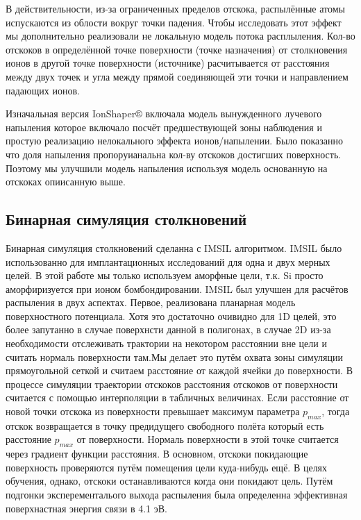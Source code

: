 \documentclass[a4paper,fontsize=12pt]{article}
\begin{document}
В действительности, из-за ограниченных пределов отскока, распылённые атомы испускаются из облости вокруг точки падения. Чтобы исследовать этот эффект мы дополнительно реализовали не локальную модель потока расплыления. Кол-во отскоков в определённой точке поверхности (точке назначения) от столкновения ионов в другой точке поверхности (источнике) расчитывается от расстояния между двух точек и угла между прямой соединяющей эти точки и направлением падающих ионов.

Изначальная версия IonShaper® включала модель вынужденного лучевого напыления которое включало посчёт предшествующей зоны наблюдения и простую реализацию нелокального эффекта ионов/напылении. Было показанно что доля напыления пропоруианальна кол-ву отскоков достигших поверхность. Поэтому мы улучшили модель напыления используя модель основанную на отскоках опиисанную выше.

\subsection{Бинарная симуляция столкновений}

Бинарная симуляция столкновений сделанна с IMSIL алгоритмом. IMSIL было использованно для имплантационных исследований для одна и двух мерных целей. В этой работе мы только используем аморфные цели, т.к. Si просто аморфиризуется при ионом бомбондировании. IMSIL был улучшен для расчётов распыления в двух аспектах. Первое, реализована планарная модель поверхностного потенциала. Хотя это достаточно очивидно для 1D целей, это более запутанно в случае поверхнсти данной в полигонах, в случае 2D из-за необходимости отслеживать трактории на некотором расстоянии вне цели и считать нормаль поверхности там.Мы делает это путём охвата зоны симуляции прямоугольной сеткой и считаем расстояние от каждой ячейки до поверхности. В процессе симуляции траектории отскоков расстояния отскоков от поверхности считается с помощью интерполяции в табличных величинах. Если расстояние от новой точки отскока из поверхности превышает максимум параметра $p_{max}$, тогда отскок возвращается в точку предидущего свободного полёта который есть расстояние $p_{max}$ от поверхности. Нормаль поверхности в этой точке считается через градиент функции расстояния. В основном, отскоки покидающие поверхность проверяются путём помещения цели куда-нибудь ещё. В целях обучения, однако, отскоки останавливаются когда они покидают цель. Путём подгонки эксперементалього выхода распыления была определенна эффективная поверхнастная энергия связи в 4.1 эВ.
\end{document}
